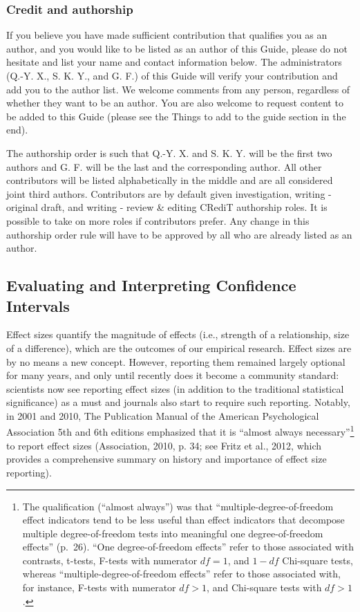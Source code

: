 \documentclass[
  man,
  colorlinks=true,linkcolor=blue,citecolor=blue,urlcolor=blue]{apa7}
\begin{document}
\hypertarget{credit-and-authorship}{%
\subsubsection{Credit and authorship}\label{credit-and-authorship}}

If you believe you have made sufficient contribution that qualifies you
as an author, and you would like to be listed as an author of this
Guide, please do not hesitate and list your name and contact information
below. The administrators (Q.-Y. X., S. K. Y., and G. F.) of this Guide
will verify your contribution and add you to the author list. We welcome
comments from any person, regardless of whether they want to be an
author. You are also welcome to request content to be added to this
Guide (please see the Things to add to the guide section in the end).

The authorship order is such that Q.-Y. X. and S. K. Y. will be the
first two authors and G. F. will be the last and the corresponding
author. All other contributors will be listed alphabetically in the
middle and are all considered joint third authors. Contributors are by
default given investigation, writing - original draft, and writing -
review \& editing CRediT authorship roles. It is possible to take on
more roles if contributors prefer. Any change in this authorship order
rule will have to be approved by all who are already listed as an
author.

\hypertarget{evaluating-and-interpreting-confidence-intervals}{%
\subsection{Evaluating and Interpreting Confidence
Intervals}\label{evaluating-and-interpreting-confidence-intervals}}

Effect sizes quantify the magnitude of effects (i.e., strength of a
relationship, size of a difference), which are the outcomes of our
empirical research. Effect sizes are by no means a new concept. However,
reporting them remained largely optional for many years, and only until
recently does it become a community standard: scientists now see
reporting effect sizes (in addition to the traditional statistical
significance) as a must and journals also start to require such
reporting. Notably, in 2001 and 2010, The Publication Manual of the
American Psychological Association 5th and 6th editions emphasized that
it is ``almost always necessary''\footnote{The qualification (``almost
  always'') was that ``multiple-degree-of-freedom effect indicators tend
  to be less useful than effect indicators that decompose multiple
  degree-of-freedom tests into meaningful one degree-of-freedom
  effects'' (p.~26). ``One degree-of-freedom effects'' refer to those
  associated with contrasts, t-tests, F-tests with numerator \(df = 1\),
  and \(1-df\) Chi-square tests, whereas ``multiple-degree-of-freedom
  effects'' refer to those associated with, for instance, F-tests with
  numerator \(df > 1\), and Chi-square tests with \(df > 1\).} to report
effect sizes (Association, 2010, p. 34; see Fritz et al., 2012, which
provides a comprehensive summary on history and importance of effect
size reporting).
\end{document}
